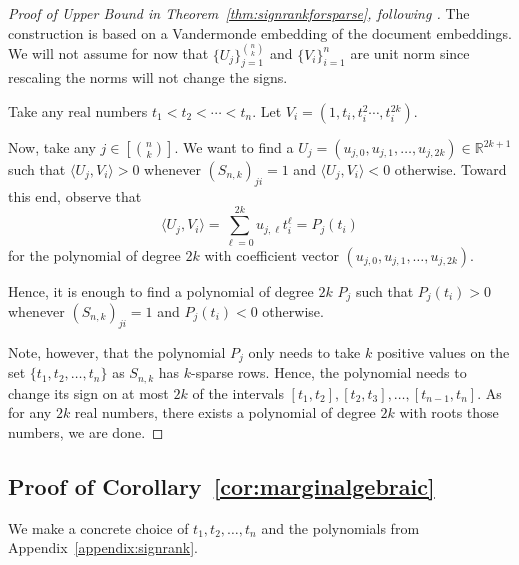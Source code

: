 \documentclass[preprint]{article}
\newcommand{\ksparsen}{S_{n,k}}
\begin{document}
\begin{proof}[Proof of Upper Bound in Theorem~\ref{thm:signrankforsparse}, following \cite{AlonFranklRodl1985}]
The construction is based on a Vandermonde embedding of the document embeddings. We will not assume for now that $\{U_j\}_{j = 1}^{\binom{n}{k}}$ and 
$\{V_i\}_{i = 1}^n$ are unit norm since rescaling the norms will not change the signs.

Take any real numbers $t_1 < t_2<\cdots <t_n.$ Let 
$V_i = (1 ,t_i, t_i^2 \cdots ,t_i^{2k}).$ 

Now, take any $j\in [\binom{n}{k}].$
We want to find a $U_j = (u_{j,0}, u_{j,1}, \ldots, u_{j, 2k})\in \mathbb{R}^{2k+1}$ such that 
$\langle U_j, V_{i}\rangle > 0 $ 
whenever $(\ksparsen)_{ji} = 1$ and $\langle U_j, V_{i}\rangle < 0 $ otherwise. Toward this end, observe that 
$$
\langle U_j, V_{i}\rangle = 
\sum_{\ell = 0}^{2k}
u_{j,\ell}t_i^\ell = P_j(t_i)
$$
for the polynomial of degree $2k$ with coefficient vector 
$(u_{j,0}, u_{j,1}, \ldots, u_{j, 2k}).$

Hence, it is enough to find a polynomial of degree $2k$ $P_j$ such that 
$P_j(t_i)>0$ whenever $(\ksparsen)_{ji} = 1$ and 
$P_j(t_i)<0$ otherwise. 

Note, however, that the polynomial 
$P_j$ only needs to take $k$ positive values on the set 
$\{t_1, t_2, \ldots, t_n\}$ as $\ksparsen$ has $k$-sparse rows. Hence, the polynomial needs to change its sign on at most $2k$ of the intervals $[t_1, t_2], [t_2, t_3], \ldots, [t_{n-1}, t_n].$ As for any $2k$ real numbers, there exists a polynomial of degree $2k$ with roots those numbers, we are done. 
\end{proof}

\subsection{Proof of Corollary~\texorpdfstring{\ref{cor:marginalgebraic}}{AlgebraicMargin}}
We make a concrete choice of $t_1, t_2, \ldots, t_n$ and the polynomials from Appendix~\ref{appendix:signrank}.
\end{document}
